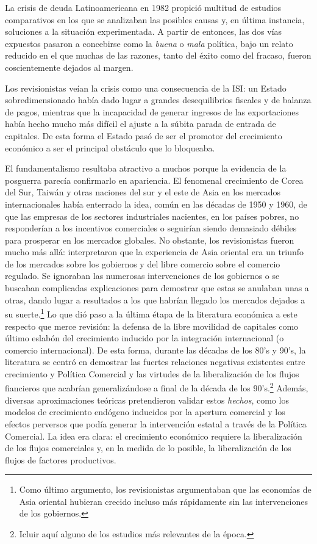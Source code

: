 \documentclass[10pt,a4paper]{article}
\begin{document}
La crisis de deuda Latinoamericana en 1982 propició multitud de estudios comparativos en los que se analizaban las posibles causas y, en última instancia, soluciones a la situación experimentada. A partir de entonces, las dos vías expuestos pasaron a concebirse como la \textit{buena} o \textit{mala} política, bajo un relato reducido en el que muchas de las razones, tanto del éxito como del fracaso, fueron coscientemente dejados al margen.  

Los revisionistas veían la crisis como una consecuencia de la ISI: un Estado sobredimensionado había dado lugar a grandes desequilibrios fiscales y de balanza de pagos, mientras que la incapacidad de generar ingresos de las exportaciones había hecho mucho más difícil el ajuste a la súbita parada de entrada de capitales. De esta forma el Estado pasó de ser el promotor del crecimiento económico a ser el principal obstáculo que lo bloqueaba. 

El fundamentalismo resultaba atractivo a muchos porque la evidencia de la posguerra parecía confirmarlo en apariencia. El fenomenal crecimiento de Corea del Sur, Taiwán y otras naciones del sur y el este de Asia en los mercados internacionales había enterrado la idea, común en las décadas de 1950 y 1960, de que las empresas de los sectores industriales nacientes, en los países pobres, no responderían a los incentivos comerciales o seguirían siendo demasiado débiles para prosperar en los mercados globales. No obstante, los revisionistas fueron mucho más allá: interpretaron que la experiencia de Asia oriental era un triunfo de los mercados sobre los gobiernos y del libre comercio sobre el comercio regulado. Se ignoraban las numerosas intervenciones de los gobiernos o se buscaban complicadas explicaciones para demostrar que estas se anulaban unas a otras, dando lugar a resultados a los que habrían llegado los mercados dejados a su suerte.\footnote{%
    Como último argumento, los revisionistas argumentaban que las economías de Asia oriental hubieran crecido incluso más rápidamente sin las intervenciones de los gobiernos.
} Lo que dió paso a la última étapa de la literatura económica a este respecto que merce revisión: la defensa de la libre movilidad de capitales como último eslabón del crecimiento inducido por la integración internacional (o comercio internacional). De esta forma, durante las décadas de los 80's y 90's, la literatura se centró en demostrar las fuertes relaciones negativas existentes entre crecimiento y Política Comercial y las virtudes de la liberalización de los flujos fiancieros que acabrían generalizándose a final de la década de los 90's.\footnote{
Icluir aquí alguno de los estudios más relevantes de la época. 
} Además, diversas aproximaciones teóricas pretendieron validar estos \textit{hechos}, como los modelos de crecimiento endógeno inducidos por la apertura comercial y los efectos perversos que podía generar la intervención estatal a través de la Política Comercial. La idea era clara: el crecimiento económico requiere la liberalización de los flujos comerciales y, en la medida de lo posible, la liberalización de los flujos de factores productivos. 
\end{document}
